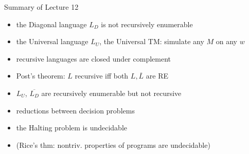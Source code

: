 \documentclass[handout]{beamer}
\begin{document}
\begin{frame}{Summary of Lecture 12}

    \begin{itemize}
        \item the Diagonal language $L_D$ is not recursively enumerable
        \item the Universal language $L_U$, the Universal TM: simulate any $M$ on any $w$
        \item recursive languages are closed under complement
        \item Post's theorem: $L$ recursive iff both $L,\overline{L}$ are RE
        \item $L_U$, $\overline{L_D}$ are recursively enumerable but not recursive
        \item reductions between decision problems
        \item the Halting problem is undecidable        
        \item (Rice's thm: nontriv. properties of programs are undecidable)
    \end{itemize}

\end{frame}
\end{document}
